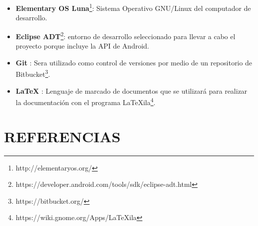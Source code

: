 \documentclass{pre-tfg}
\begin{document}
\begin{itemize}
  \item \textbf{Elementary OS Luna}\footnote{http://elementaryos.org/}: Sistema Operativo GNU/Linux del computador de desarrollo.
  \item \textbf{Eclipse ADT}\footnote{https://developer.android.com/tools/sdk/eclipse-adt.html}: entorno de desarrollo seleccionado para llevar a cabo el proyecto porque incluye la API de Android.
  \item \textbf{Git} \cite{Hinojosa14} : Sera utilizado como control de versiones por medio de un repositorio de Bitbucket\footnote{https://bitbucket.org/}.
  \item \textbf{\LaTeX} \cite{Lamport86} : Lenguaje de marcado de documentos que se utilizará para realizar la documentación con el programa LaTeXila\footnote{https://wiki.gnome.org/Apps/LaTeXila}.
\end{itemize}

\newpage

\section{REFERENCIAS}

\renewcommand\refname{}
\vspace{-1cm}

 

\end{document}
